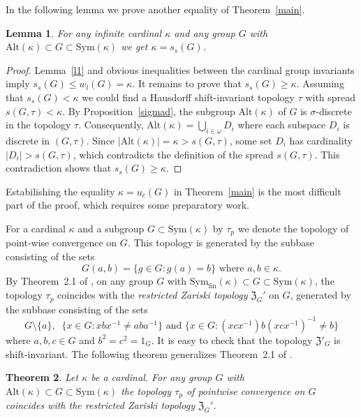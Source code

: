 \documentclass[11pt, twoside]{amsart}
\newtheorem{theorem}{Theorem}
\newtheorem{lemma}[theorem]{Lemma}
\theoremstyle{definition}
\begin{document}
In the following lemma we prove another equality of Theorem~\ref{main}.

\begin{lemma}\label{l2} For any infinite cardinal $\kappa$ and any group $G$ with ${\mathrm{Alt}}(\kappa)\subset G\subset{\mathrm{Sym}}(\kappa)$ we get
$\kappa=s_s(G)$.
\end{lemma}

\begin{proof} Lemma~\ref{l1} and obvious inequalities between the cardinal group invariants imply $s_s(G)\le w_l(G)=\kappa$. It remains to prove that $s_s(G)\ge \kappa$. Assuming that $s_s(G)<\kappa$ we could find a Hausdorff shift-invariant topology $\tau$ with spread $s(G,\tau)<\kappa$. By Proposition~\ref{sigmad},  the subgroup ${\mathrm{Alt}}(\kappa)$ of $G$ is $\sigma$-discrete in the topology $\tau$. Consequently, ${\mathrm{Alt}}(\kappa)=\bigcup_{i\in{\omega}}D_i$ where each subspace $D_i$ is discrete in $(G,\tau)$. Since $|{\mathrm{Alt}}(\kappa)|=\kappa>s(G,\tau)$, some set $D_i$ has cardinality $|D_i|>s(G,\tau)$, which contradicts the definition of the spread $s(G,\tau)$. This contradiction shows that $s_s(G)\ge\kappa$.
\end{proof}

Estabilishing the equality $\kappa=u_c(G)$ in Theorem~\ref{main} is the most difficult part of the proof, which requires some preparatory work.

For a cardinal $\kappa$ and a subgroup $G\subset{\mathrm{Sym}}(\kappa)$ by $\tau_p$ we denote the topology of point-wise convergence on $G$. This topology is generated by the subbase consisting of the sets
$$G(a,b)=\{g\in G:g(a)=b\}\mbox{ \ where \ }a,b\in \kappa.$$ By Theorem~2.1 of \cite{BGP}, on any group $G$ with ${\mathrm{Sym}}_{\mathrm{fin}}(\kappa)\subset G\subset{\mathrm{Sym}}(\kappa)$, the topology $\tau_p$ coincides with the {\em restricted Zariski topology} ${\mathfrak Z}_G'$ on $G$, generated by the subbase consisting of the sets $$G\setminus\{a\},\;\;\{x\in G:xbx^{-1}\ne aba^{-1}\}\mbox{ \  and \ }\{x\in G:(xcx^{-1})b(xcx^{-1})^{-1}\ne b\}$$ where $a,b,c\in G$ and $b^2=c^2=1_G$. It is easy to check that the topology ${\mathfrak Z}'_G$ is shift-invariant. The following theorem generalizes Theorem~2.1 of \cite{BGP}.

\begin{theorem}\label{t:zariski} Let $\kappa$ be a cardinal. For any group $G$ with ${\mathrm{Alt}}(\kappa)\subset G\subset{\mathrm{Sym}}(\kappa)$ the topology $\tau_p$ of pointwise convergence on $G$ coincides with the restricted Zariski topology ${\mathfrak Z}_G'$.
\end{theorem}
\end{document}
